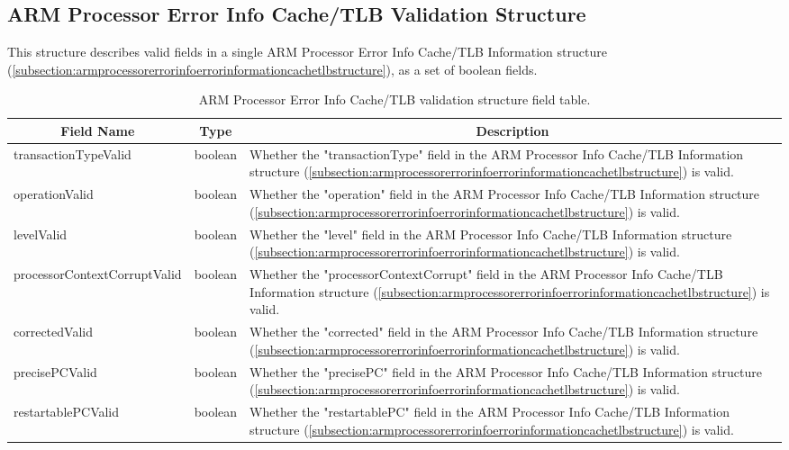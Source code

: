 \documentclass{report}
\newcommand*{\thead}[1]{\multicolumn{1}{|c|}{\bfseries #1}}
\newcommand*{\jsontable}[1]{
    \begin{table}[!ht]
    \label{#1}
    \centering
    \begin{adjustbox}{center}
    \begin{tabular}{|l|c|p{8cm}|}
    \hline
    \thead{Field Name} & \thead{Type} & \thead{Description} \\
    \hline
}
\newcommand*{\jsontableend}[1]{
    \hline
    \end{tabular}
    \end{adjustbox}
    \caption{#1}
    \label{table:#1}
    \end{table}
    \FloatBarrier
}
\begin{document}
\subsection{ARM Processor Error Info Cache/TLB Validation Structure}
\label{subsection:armprocessorerrorinfocachetlbvalidationstructure}
This structure describes valid fields in a single ARM Processor Error Info Cache/TLB Information structure (\ref{subsection:armprocessorerrorinfoerrorinformationcachetlbstructure}), as a set of boolean fields.
\jsontable{table:armprocessorerrorinfocachetlbvalidationstructure}
transactionTypeValid & boolean & Whether the "transactionType" field in the ARM Processor Info Cache/TLB Information structure (\ref{subsection:armprocessorerrorinfoerrorinformationcachetlbstructure}) is valid.\\
\hline
operationValid & boolean & Whether the "operation" field in the ARM Processor Info Cache/TLB Information structure (\ref{subsection:armprocessorerrorinfoerrorinformationcachetlbstructure}) is valid.\\
\hline
levelValid & boolean & Whether the "level" field in the ARM Processor Info Cache/TLB Information structure (\ref{subsection:armprocessorerrorinfoerrorinformationcachetlbstructure}) is valid.\\
\hline
processorContextCorruptValid & boolean & Whether the "processorContextCorrupt" field in the ARM Processor Info Cache/TLB Information structure (\ref{subsection:armprocessorerrorinfoerrorinformationcachetlbstructure}) is valid.\\
\hline
correctedValid & boolean & Whether the "corrected" field in the ARM Processor Info Cache/TLB Information structure (\ref{subsection:armprocessorerrorinfoerrorinformationcachetlbstructure}) is valid.\\
\hline
precisePCValid & boolean & Whether the "precisePC" field in the ARM Processor Info Cache/TLB Information structure (\ref{subsection:armprocessorerrorinfoerrorinformationcachetlbstructure}) is valid.\\
\hline
restartablePCValid & boolean & Whether the "restartablePC" field in the ARM Processor Info Cache/TLB Information structure (\ref{subsection:armprocessorerrorinfoerrorinformationcachetlbstructure}) is valid.\\
\jsontableend{ARM Processor Error Info Cache/TLB validation structure field table.}

\end{document}

